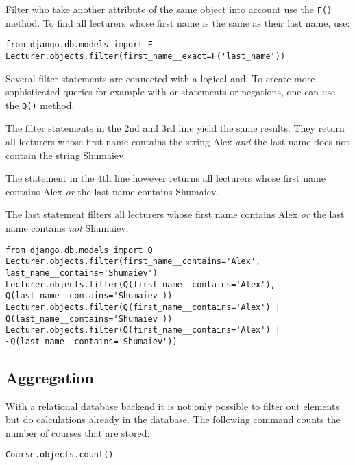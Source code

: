 Filter who take another attribute of the same object into account use the \lstinline|F()| method. To find all lecturers whose first name is the same as their last name, use:
\begin{lstlisting}[style=Python, caption=Filtering objects with attribute comparisons, label=lst:filtering_objects_attributes]
from django.db.models import F
Lecturer.objects.filter(first_name__exact=F('last_name'))
\end{lstlisting}

Several filter statements are connected with a logical and. To create more sophisticated queries for example with or statements or negations, one can use the \lstinline|Q()| method.

The filter statements in the 2nd and 3rd line yield the same results. They return all lecturers whose first name contains the string Alex \emph{and} the last name does not contain the string Shumaiev.

The statement in the 4th line however returns all lecturers whose first name contains Alex \emph{or} the last name contains Shumaiev.

The last statement filters all lecturers whose first name contains Alex \emph{or} the last name contains \emph{not} Shumaiev.

\begin{lstlisting}[style=Python, caption=Filtering objects with or statements and negations, label=lst:filtering_objects_or]
from django.db.models import Q
Lecturer.objects.filter(first_name__contains='Alex', last_name__contains='Shumaiev')
Lecturer.objects.filter(Q(first_name__contains='Alex'), Q(last_name__contains='Shumaiev'))
Lecturer.objects.filter(Q(first_name__contains='Alex') | Q(last_name__contains='Shumaiev'))
Lecturer.objects.filter(Q(first_name__contains='Alex') | ~Q(last_name__contains='Shumaiev'))
\end{lstlisting}

\subsection{Aggregation}

With a relational database backend it is not only possible to filter out elements but do calculations already in the database. The following command counts the number of courses that are stored:
\begin{lstlisting}[style=Python, caption=Counting objects, label=lst:counting_objects]
Course.objects.count()
\end{lstlisting}

